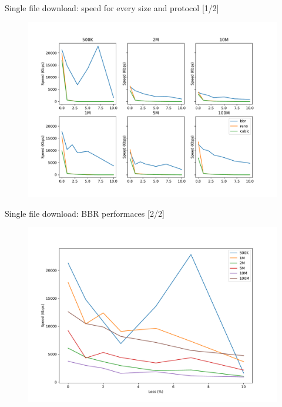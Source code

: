 \documentclass[13pt,aspectratio=43]{beamer}
\begin{document}
\begin{frame}{Single file download: speed for every size and protocol [1/2]}
  \begin{figure}
	  \includegraphics[width=\textwidth,height=\textheight,keepaspectratio]{../http_single_test/sizes_plot.pdf}
  \end{figure}
\end{frame}

\begin{frame}{Single file download: BBR performaces [2/2]}
  \begin{figure}
	  \includegraphics[width=\textwidth,height=\textheight,keepaspectratio]{../http_single_test/size_bbr_plot.pdf}
  \end{figure}
\end{frame}
\end{document}
